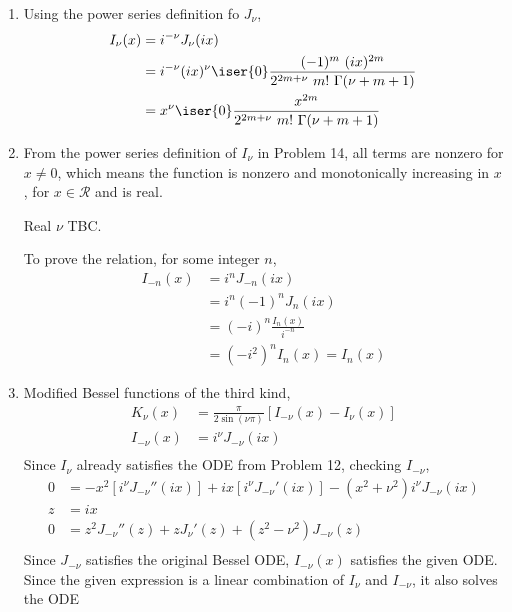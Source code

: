 \begin{enumerate}
    \item Using the power series definition fo $ J_\nu $,
          \begin{align}
              I_\nu(x) & = i^{-\nu}J_\nu(ix)                                  \\
                       & = i^{-\nu}(ix)^\nu \iser{0} \frac{(-1)^m\ (ix)^{2m}}
              {2^{2m + \nu}\ m!\ \Gamma(\nu + m + 1)}                         \\
                       & = x^{\nu} \iser{0} \frac{x^{2m}}
              {2^{2m + \nu}\ m!\ \Gamma(\nu + m + 1)}
          \end{align}

    \item From the power series definition of $ I_\nu $ in Problem 14, all terms are
          nonzero for $ x \neq 0 $, which means the function is nonzero and monotonically
          increasing in $ x $, for $ x \in \mathcal{R} $ and is real. \par
          Real $ \nu $ TBC. \par
          To prove the relation, for some integer $ n $,
          \begin{align}
              I_{-n}(x) & = i^{n} J_{-n}(ix)             \\
                        & = i^{n} (-1)^n J_n(ix)         \\
                        & = (-i)^n \frac{I_n(x)}{i^{-n}} \\
                        & = (-i^2)^n I_n(x) = I_n(x)
          \end{align}

    \item Modified Bessel functions of the third kind,
          \begin{align}
              K_\nu(x)    & = \frac{\pi}{2\sin(\nu \pi)} [I_{-\nu}(x) - I_\nu(x)] \\
              I_{-\nu}(x) & = i^{\nu} J_{-\nu}(ix)                                \\
          \end{align}
          Since $ I_\nu $ already satisfies the ODE from Problem 12, checking
          $ I_{-\nu} $,
          \begin{align}
              0 & = -x^2 [i^{\nu} J_{-\nu}''(ix)] + ix [i^{\nu}J_{-\nu}'(ix)] -
              (x^2 + \nu^2) i^{\nu} J_{-\nu}(ix)                                 \\
              z & = ix                                                           \\
              0 & = z^2 J_{-\nu}''(z) + z J_{\nu}'(z) + (z^2 - \nu^2)J_{-\nu}(z) \\
          \end{align}
          Since $ J_{-\nu} $ satisfies the original Bessel ODE, $I_{-\nu}(x)$
          satisfies the given ODE. Since the given expression is a linear combination of
          $ I_{\nu} $ and $ I_{-\nu} $, it also solves the ODE
\end{enumerate}